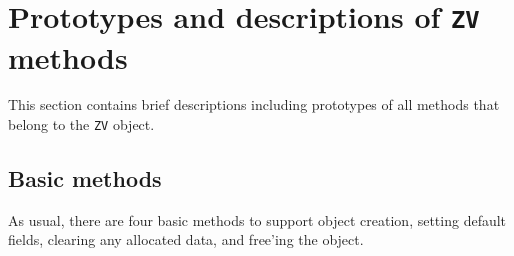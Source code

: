 \par
\section{Prototypes and descriptions of {\tt ZV} methods}
\label{section:ZV:proto}
\par
This section contains brief descriptions including prototypes
of all methods that belong to the {\tt ZV} object.
\par
\subsection{Basic methods}
\label{subsection:ZV:proto:basics}
\par
As usual, there are four basic methods to support object creation,
setting default fields, clearing any allocated data, and free'ing
the object.
\par
